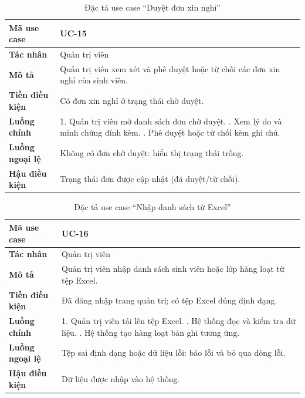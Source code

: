 \begin{table}[H]
\centering
\small
\caption{Đặc tả use case ``Duyệt đơn xin nghỉ''}
\label{tab:uc-approve}
\begin{tabular}{|p{3cm}|p{10.6cm}|}
\hline
\textbf{Mã use case} & UC-15 \\ \hline
\textbf{Tác nhân} & Quản trị viên \\ \hline
\textbf{Mô tả} & Quản trị viên xem xét và phê duyệt hoặc từ chối các đơn xin nghỉ của sinh viên. \\ \hline
\textbf{Tiền điều kiện} & Có đơn xin nghỉ ở trạng thái chờ duyệt. \\ \hline
\textbf{Luồng chính} & 1. Quản trị viên mở danh sách đơn chờ duyệt. \newline 2. Xem lý do và minh chứng đính kèm. \newline 3. Phê duyệt hoặc từ chối kèm ghi chú. \\ \hline
\textbf{Luồng ngoại lệ} & Không có đơn chờ duyệt: hiển thị trạng thái trống. \\ \hline
\textbf{Hậu điều kiện} & Trạng thái đơn được cập nhật (đã duyệt/từ chối). \\ \hline
\end{tabular}
\end{table}

\begin{table}[H]
\centering
\small
\caption{Đặc tả use case ``Nhập danh sách từ Excel''}
\label{tab:uc-import}
\begin{tabular}{|p{3cm}|p{10.6cm}|}
\hline
\textbf{Mã use case} & UC-16 \\ \hline
\textbf{Tác nhân} & Quản trị viên \\ \hline
\textbf{Mô tả} & Quản trị viên nhập danh sách sinh viên hoặc lớp hàng loạt từ tệp Excel. \\ \hline
\textbf{Tiền điều kiện} & Đã đăng nhập trang quản trị; có tệp Excel đúng định dạng. \\ \hline
\textbf{Luồng chính} & 1. Quản trị viên tải lên tệp Excel. \newline 2. Hệ thống đọc và kiểm tra dữ liệu. \newline 3. Hệ thống tạo hàng loạt bản ghi tương ứng. \\ \hline
\textbf{Luồng ngoại lệ} & Tệp sai định dạng hoặc dữ liệu lỗi: báo lỗi và bỏ qua dòng lỗi. \\ \hline
\textbf{Hậu điều kiện} & Dữ liệu được nhập vào hệ thống. \\ \hline
\end{tabular}
\end{table}

